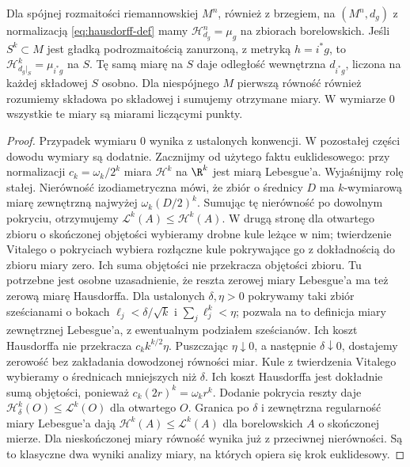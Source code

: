 \begin{twierdzenie}
\label{thm:hausdorff-rownosc}
Dla spójnej rozmaitości riemannowskiej $M^n$, również
z brzegiem, na $(M^n,d_g)$ z normalizacją
\eqref{eq:hausdorff-def} mamy
$\mathcal H^n_{d_g}=\mu_g$
na zbiorach borelowskich.
Jeśli $S^k\subset M$ jest gładką
podrozmaitością zanurzoną, z metryką $h=i^*g$,
to $\mathcal H^k_{d_g|_S}=\mu_{i^*g}$
na $S$. Tę samą miarę na $S$ daje
odległość wewnętrzna $d_{i^*g}$, liczona na każdej
składowej $S$ osobno. Dla niespójnego $M$ pierwszą
równość również rozumiemy składowa po składowej
i sumujemy otrzymane miary. W wymiarze $0$ wszystkie
te miary są miarami liczącymi punkty.
\end{twierdzenie}
\begin{proof}
Przypadek wymiaru $0$ wynika z ustalonych konwencji.
W pozostałej części dowodu wymiary są dodatnie.
Zacznijmy od użytego faktu euklidesowego:
przy normalizacji $c_k=\omega_k/2^k$
miara $\mathcal H^k$ na $\R^k$ jest
miarą Lebesgue'a. Wyjaśnijmy rolę stałej.
Nierówność izodiametryczna mówi, że zbiór
o średnicy $D$ ma $k$-wymiarową miarę
zewnętrzną najwyżej $\omega_k(D/2)^k$.
Sumując tę nierówność po dowolnym
pokryciu, otrzymujemy
$\mathcal L^k(A)\leq\mathcal H^k(A)$.
W drugą stronę dla otwartego zbioru
o skończonej objętości wybieramy drobne
kule leżące w nim; twierdzenie Vitalego
o pokryciach wybiera rozłączne kule
pokrywające go z dokładnością do zbioru
miary zero. Ich suma objętości nie
przekracza objętości zbioru. Tu potrzebne jest
osobne uzasadnienie, że reszta zerowej miary Lebesgue'a
ma też zerową miarę Hausdorffa. Dla ustalonych
$\delta,\eta>0$ pokrywamy taki zbiór sześcianami
o bokach $\ell_j<\delta/\sqrt{k}$ i
$\sum_j\ell_j^k<\eta$; pozwala na to definicja miary
zewnętrznej Lebesgue'a, z ewentualnym podziałem sześcianów.
Ich koszt Hausdorffa nie przekracza
$c_k k^{k/2}\eta$. Puszczając $\eta\downarrow0$,
a następnie $\delta\downarrow0$, dostajemy zerowość
bez zakładania dowodzonej równości miar.
Kule z twierdzenia Vitalego wybieramy o średnicach
mniejszych niż $\delta$. Ich koszt Hausdorffa jest
dokładnie sumą objętości, ponieważ $c_k(2r)^k=\omega_k r^k$.
Dodanie pokrycia reszty daje
$\mathcal H^k_\delta(O)\leq\mathcal L^k(O)$ dla otwartego $O$.
Granica po $\delta$ i zewnętrzna regularność miary
Lebesgue'a dają $\mathcal H^k(A)\leq\mathcal L^k(A)$
dla borelowskich $A$ o skończonej mierze.
Dla nieskończonej miary równość wynika już
z przeciwnej nierówności.
Są to klasyczne dwa wyniki analizy miary,
na których opiera się krok euklidesowy.


\end{proof}
